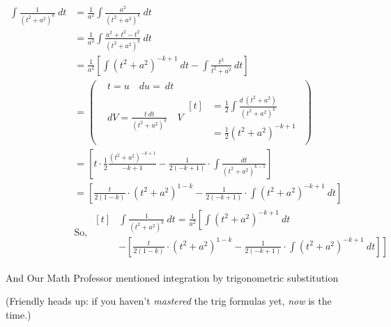 \documentclass{article}
\begin{document}
\begin{align*}
\int\frac{1}{(t^2+a^2)^k}\ dt&=\frac{1}{a^2}\int\frac{a^2}{(t^2+a^2)^k}\ dt\\
&=\frac{1}{a^2}\int\frac{a^2+t^2-t^2}{(t^2+a^2)^k}\ dt\\
&=\frac{1}{a^2}\left[\int(t^2+a^2)^{-k+1}\ dt-\int\frac{t^2}{t^2+a^2}\ dt\right]\\
&=\left(\begin{aligned}&t=u\quad du=\ dt\\&dV=\frac{t\ dt}{(t^2+a^2)^k}\quad V\begin{aligned}[t]&=\frac{1}{2}\int\frac{d\ (t^2+a^2)}{(t^2+a^2)^k}\\&=\frac{1}{2}(t^2+a^2)^{-k+1}\end{aligned}\end{aligned}\right)\\
&=\left[t\cdot\frac{1}{2}\frac{(t^2+a^2)^{-k+1}}{-k+1}-\frac{1}{2(-k+1)}\cdot\int\frac{dt}{(t^2+a^2)^{k-1}}\right]\\
&=\left[\frac{t}{2(1-k)}\cdot(t^2+a^2)^{1-k}-\frac{1}{2(-k+1)}\cdot\int(t^2+a^2)^{-k+1}\ dt\right]\\
&\mbox{So, }\begin{aligned}[t]&\int\frac{1}{(t^2+a^2)^k}\ dt=\frac{1}{a^2}\left[\int(t^2+a^2)^{-k+1}\ dt\right.\\&\left.-\left[\frac{t}{2(1-k)}\cdot(t^2+a^2)^{1-k}-\frac{1}{2(-k+1)}\cdot\int(t^2+a^2)^{-k+1}\ dt\right]\right]\end{aligned}
\end{align*}

\vspace{10pt}

And Our Math Professor mentioned integration by trigonometric substitution

(Friendly heads up: if you haven't \textit{mastered} the trig formulas yet, \textit{now} is the time.)
\end{document}
